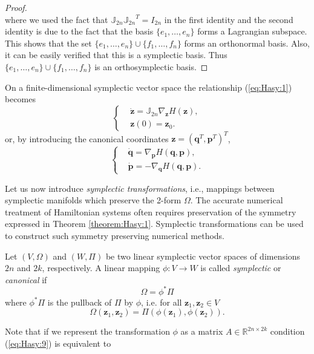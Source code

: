 {\begin{proof}
\begin{equation}
\end{equation}
where we used the fact that $\mathbb J_{2n} {\mathbb J_{2n}}^T = I_{2n}$ in the first identity and the second identity is due to the fact that the basis $\{ e_1,\dots,e_n \}$ forms a Lagrangian subspace. This shows that the set $\{ e_1,\dots,e_n \}\cup \{ f_1,\dots,f_n \}$ forms an orthonormal basis. Also, it can be easily verified that this is a symplectic basis. Thus $\{ e_1,\dots,e_n \}\cup \{ f_1,\dots,f_n \}$ is an orthosymplectic basis.
\end{proof}
\begin{theorem} \label{theorem:Hasy:1.7} \cite{Marsden:1999ck}
On a finite-dimensional symplectic vector space the relationship (\ref{eq:Hasy:1}) becomes 
\begin{equation} \label{eq:Hasy:7}
\left\{
\begin{aligned}
	&\dot {\mathbf z} = \mathbb{J}_{2n} \nabla_{\mathbf z} H(\mathbf z), \\
	& \mathbf z(0) = \mathbf z_0.
\end{aligned}
\right.
\end{equation}
or, by introducing the canonical coordinates $\mathbf z = (\mathbf q^T, \mathbf p^T)^T$,
\begin{equation} \label{eq:Hasy:8}
\left\{
\begin{aligned}
	&\dot {\mathbf q} = \nabla_{\mathbf p} H(\mathbf q,\mathbf p),\\
	&\dot {\mathbf p} = - \nabla_{\mathbf q} H(\mathbf q,\mathbf p).
\end{aligned}
\right.
\end{equation}
\end{theorem}
}

{\edit Let} us now introduce \emph{symplectic transformations}, i.e., mappings between symplectic manifolds which preserve the 2-form $\Omega$. The accurate numerical treatment of Hamiltonian systems often requires preservation of the symmetry expressed in Theorem \ref{theorem:Hasy:1}. Symplectic transformations can be used to construct such symmetry preserving numerical methods. 

{\edit
\begin{definition}
Let $(V,\Omega)$ and $(W,\Pi)$ be two linear symplectic vector spaces of dimensions $2n$ and $2k$, respectively. A linear mapping $\phi:V \to W$ is called \emph{symplectic} or \emph{canonical} if
\begin{equation} \label{eq:Hasy:9}
	\Omega = \phi^* \Pi
\end{equation}
where $\phi^* \Pi$ is the pullback of $\Pi$ by $\phi$, i.e. for all $\mathbf{z}_1, \mathbf{z}_2\in V$
\begin{equation}
	\Omega(\mathbf{z}_1,\mathbf{z}_2) = \Pi(\phi(\mathbf{z}_1),\phi(\mathbf{z}_2)).
\end{equation}
\end{definition}

Note that if we represent the transformation $\phi$ as a matrix $A\in \mathbb R^{2n\times 2k}$ condition (\ref{eq:Hasy:9}) is equivalent to \cite{Marsden:1999ck}}

